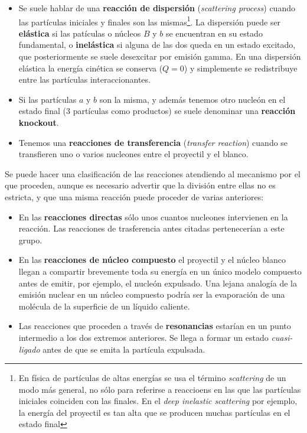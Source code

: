 \begin{itemize}
    \item Se suele hablar de una \textbf{reacción de dispersión} (\textit{scattering process}) cuando las partículas iniciales y finales son las mismas\footnote{En física de partículas de altas energías se usa el término \textit{scattering} de un modo más general, no sólo para referirse a reaccioens en las que las partículas iniciales coinciden con las finales. En el \textit{deep inelastic scattering} por ejemplo, la energía del proyectil es tan alta que se producen muchas partículas en el estado final}. La dispersión puede ser \textbf{elástica} si las patículas o núcleos $B$ y $b$ se encuentran en su estado fundamental, o \textbf{inelástica} si alguna de las dos queda en un estado excitado, que posteriormente se suele desexcitar por emisión gamma. En una dispersión elástica la energía cinética se conserva ($Q=0$) y simplemente se redistribuye entre las partículas interaccionantes.
    \item Si las partículas $a$ y $b$ son la misma, y además tenemos otro nucleón en el estado final (3 partículas como productos) se suele denominar una \textbf{reacción knockout}.
    \item Tenemos una \textbf{reacciones de transferencia} (\textit{transfer reaction}) cuando se transfieren uno o varios nucleones entre el proyectil y el blanco.
\end{itemize}


Se puede hacer una clasificación de las reacciones atendiendo al mecanismo por el que proceden, aunque es necesario advertir que la división entre ellas no es estricta, y que una misma reacción puede proceder de varias anteriores:

\begin{itemize}
    \item En las \textbf{reacciones directas} sólo unos cuantos nucleones intervienen en la reacción. Las reacciones de trasferencia antes citadas pertenecerían a este grupo.
    \item En las \textbf{reacciones de núcleo compuesto} el proyectil y el núcleo blanco llegan a compartir brevemente toda su energía en un único modelo compuesto antes de emitir, por ejemplo, el nucleón expulsado. Una lejana analogía de la emisión nuclear en un núcleo compuesto podría ser la evaporación de una molécula de la superficie de un líquido caliente.
    \item Las reacciones que proceden a través de \textbf{resonancias} estarían en un punto intermedio a los dos extremos anteriores. Se llega a formar un estado \textit{cuasi-ligado} antes de que se emita la partícula expulsada.
\end{itemize}

